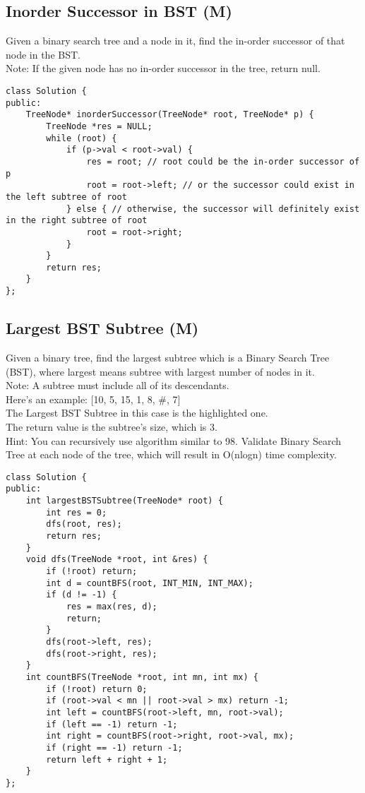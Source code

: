 \subsection{Inorder Successor in BST (M)}
Given a binary search tree and a node in it, find the in-order successor of that node in the BST.\\

Note: If the given node has no in-order successor in the tree, return null.\\

\begin{lstlisting}
class Solution {
public:
    TreeNode* inorderSuccessor(TreeNode* root, TreeNode* p) {
        TreeNode *res = NULL;
        while (root) {
            if (p->val < root->val) {
                res = root; // root could be the in-order successor of p
                root = root->left; // or the successor could exist in the left subtree of root
            } else { // otherwise, the successor will definitely exist in the right subtree of root
                root = root->right; 
            }
        }
        return res;
    }
};
\end{lstlisting}


\subsection{Largest BST Subtree (M)}
Given a binary tree, find the largest subtree which is a Binary Search Tree (BST), where largest means subtree with largest number of nodes in it.\\

Note: A subtree must include all of its descendants.\\

Here's an example: [10, 5, 15, 1, 8, \#, 7]\\
The Largest BST Subtree in this case is the highlighted one. \\
The return value is the subtree's size, which is 3.\\

Hint: You can recursively use algorithm similar to 98. Validate Binary Search Tree at each node of the tree, which will result in O(nlogn) time complexity.\\

\begin{lstlisting}
class Solution {
public:
    int largestBSTSubtree(TreeNode* root) {
        int res = 0;
        dfs(root, res);
        return res;
    }
    void dfs(TreeNode *root, int &res) {
        if (!root) return;
        int d = countBFS(root, INT_MIN, INT_MAX);
        if (d != -1) {
            res = max(res, d);
            return;
        }
        dfs(root->left, res);
        dfs(root->right, res);
    }
    int countBFS(TreeNode *root, int mn, int mx) {
        if (!root) return 0;
        if (root->val < mn || root->val > mx) return -1;
        int left = countBFS(root->left, mn, root->val);
        if (left == -1) return -1;
        int right = countBFS(root->right, root->val, mx);
        if (right == -1) return -1;
        return left + right + 1;
    }
};
\end{lstlisting}


